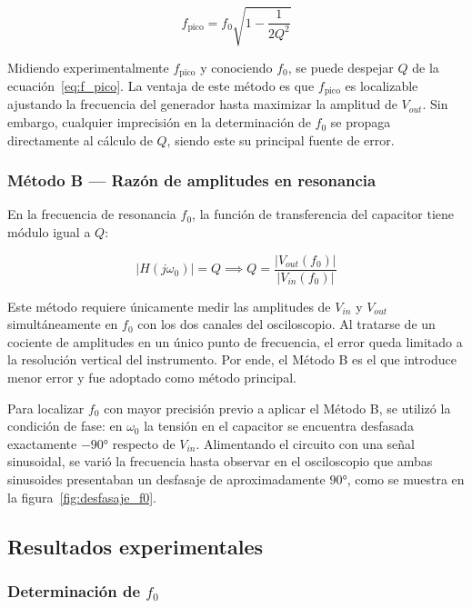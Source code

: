 \begin{equation}
    f_{\text{pico}} = f_0 \sqrt{1 - \frac{1}{2Q^2}}
    \label{eq:f_pico}
\end{equation}

Midiendo experimentalmente $f_{\text{pico}}$ y conociendo $f_0$, se puede 
despejar $Q$ de la ecuación~\ref{eq:f_pico}. La ventaja de este método es que 
$f_{\text{pico}}$ es localizable ajustando la frecuencia del generador hasta 
maximizar la amplitud de $V_{out}$. Sin embargo, cualquier imprecisión en la 
determinación de $f_0$ se propaga directamente al cálculo de $Q$, siendo este 
su principal fuente de error.

\subsubsection*{Método B — Razón de amplitudes en resonancia}

En la frecuencia de resonancia $f_0$, la función de transferencia del capacitor 
tiene módulo igual a $Q$:

\begin{equation}
    \left|H(j\omega_0)\right| = Q \implies Q = \frac{\left|V_{out}(f_0)\right|}{\left|V_{in}(f_0)\right|}
    \label{eq:Q_metodo_B}
\end{equation}

Este método requiere únicamente medir las amplitudes de $V_{in}$ y $V_{out}$ 
simultáneamente en $f_0$ con los dos canales del osciloscopio. Al tratarse de 
un cociente de amplitudes en un único punto de frecuencia, el error queda 
limitado a la resolución vertical del instrumento. Por ende, el Método B es el que introduce 
menor error y fue adoptado como método principal.

Para localizar $f_0$ con mayor precisión previo a aplicar el Método B, se 
utilizó la condición de fase: en $\omega_0$ la tensión en el capacitor se 
encuentra desfasada exactamente $-90°$ respecto de $V_{in}$. Alimentando el 
circuito con una señal sinusoidal, se varió la frecuencia hasta observar en el 
osciloscopio que ambas sinusoides presentaban un desfasaje de aproximadamente 
$90°$, como se muestra en la figura~\ref{fig:desfasaje_f0}.

\subsection{Resultados experimentales}

\subsubsection*{Determinación de \texorpdfstring{$f_0$}{f0}}

